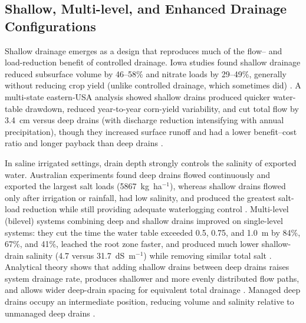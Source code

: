 \documentclass[11pt]{article}
\begin{document}
\subsection{Shallow, Multi-level, and Enhanced Drainage Configurations}

Shallow drainage emerges as a design that reproduces much of the flow-- and
load-reduction benefit of controlled drainage. Iowa studies found shallow
drainage reduced subsurface volume by 46--58\% and nitrate loads by 29--49\%,
generally without reducing crop yield (unlike controlled drainage, which
sometimes did) \parencite{Helmers2012,Schott2017}. A multi-state eastern-USA
analysis showed shallow drains produced quicker water-table drawdown, reduced
year-to-year corn-yield variability, and cut total flow by 3.4~cm versus deep
drains (with discharge reduction intensifying with annual precipitation), though
they increased surface runoff and had a lower benefit--cost ratio and longer
payback than deep drains \parencite{Ghane2021b}.

In saline irrigated settings, drain depth strongly controls the salinity of
exported water. Australian experiments found deep drains flowed continuously and
exported the largest salt loads (5867~kg~ha$^{-1}$), whereas shallow drains
flowed only after irrigation or rainfall, had low salinity, and produced the
greatest salt-load reduction while still providing adequate waterlogging control
\parencite{Christen2001b}. Multi-level (bilevel) systems combining deep and
shallow drains improved on single-level systems: they cut the time the water
table exceeded 0.5, 0.75, and 1.0~m by 84\%, 67\%, and 41\%, leached the root
zone faster, and produced much lower shallow-drain salinity (4.7 versus
31.7~dS~m$^{-1}$) while removing similar total salt
\parencite{Hornbuckle2007}. Analytical theory shows that adding shallow drains
between deep drains raises system drainage rate, produces shallower and more
evenly distributed flow paths, and allows wider deep-drain spacing for equivalent
total drainage \parencite{Hornbuckle2012}. Managed deep drains occupy an
intermediate position, reducing volume and salinity relative to unmanaged deep
drains \parencite{Ayars2006b,Christen2001b}.
\end{document}

